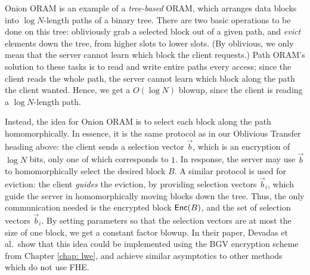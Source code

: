     Onion ORAM is an example of a \emph{tree-based} ORAM, which arranges data blocks into $\log N$-length paths of a binary tree. There are two basic operations to be done on this tree: obliviously grab a selected block out of a given path, and \emph{evict} elements down the tree, from higher slots to lower slots. (By oblivious, we only mean that the server cannot learn which block the client requests.)
    Path ORAM's solution to these tasks is to read and write entire paths every access; since the client reads the whole path, the server cannot learn which block along the path the client wanted. Hence, we get a $O(\log N)$ blowup, since the client is reading a $\log N$-length path.

    Instead, the idea for Onion ORAM is to select each block along the path homomorphically. In essence, it is the same protocol as in our Oblivious Transfer heading above: the client sends a selection vector $\vec{b}$, which is an encryption of $\log N$ bits, only one of which corresponds to $1$. In response, the server may use $\vec{b}$ to homomorphically select the desired block $B$. A similar protocol is used for eviction: the client \emph{guides} the eviction, by providing selection vectors $\vec{b}_i$, which guide the server in homomorphically moving blocks down the tree. Thus, the only communication needed is the encrypted block ${\sf Enc}(B)$, and the set of selection vectors $\vec{b}_i$. By setting parameters so that the selection vectors are at most the size of one block, we get a constant factor blowup. In their paper, Devadas et al.~show that this idea could be implemented using the BGV encryption scheme from Chapter \ref{chap: lwe}, and achieve similar asymptotics to other methods which do not use FHE.
